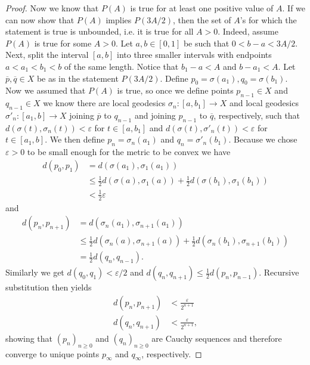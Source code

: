 \documentclass[11pt, a4paper, oneside]{memoir}
\theoremstyle{plain}\newtheorem{theorem}[subsection]{Theorem}
\theoremstyle{definition}
\begin{document}
\begin{proof}
\medskip
Now we know that $P(A)$ is true for at least one positive value of \(A\). If we can now show that \(P(A)\) implies \(P(3A/2)\), then the set of \(A\)'s for which the statement is true is unbounded, i.e. it is true for all \(A>0\). Indeed, assume $P(A)$ is true for some \(A>0\).
Let \(a,b\in [0,1]\) be such that \(0<b-a<3A/2\).
Next, split the interval \([a,b]\) into three smaller intervals with endpoints \(a<a_1<b_1<b\) of the same length.
Notice that \(b_1-a<A\) and \(b-a_1<A\).
Let \(\overline{p},\overline{q}\in X\) be as in the statement \(P(3A/2)\).
Define \(p_0=\sigma(a_1),q_0=\sigma(b_1)\).
Now we assumed that \(P(A)\) is true, so once we define points \(p_{n-1}\in X\) and \(q_{n-1}\in X\) we know there are local geodesics \(\sigma_n:[a,b_1]\to X\) and local geodesics \(\sigma'_n:[a_1,b]\to X\) joining \(\overline{p}\) to \(q_{n-1}\) and joining \(p_{n-1}\) to \(\overline{q}\), respectively, such that \(d(\sigma(t),\sigma_n(t))<\varepsilon\) for \(t\in [a,b_1]\) and \(d(\sigma(t),\sigma'_n(t))<\varepsilon\) for \(t\in [a_1,b]\).
We then define \(p_n=\sigma_n(a_1)\) and \(q_n=\sigma'_n(b_1)\).
Because we chose \(\varepsilon>0\) to be small enough for the metric to be convex we have 
\begin{align*}
d(p_0,p_1)&=d(\sigma(a_1),\sigma_1(a_1))\\
&\leq \frac{1}{2}d(\sigma(a),\sigma_1(a))+\frac{1}{2}d(\sigma(b_1),\sigma_1(b_1))\\
&<\frac{1}{2}\varepsilon
\end{align*}
and
\begin{align*}
d(p_n,p_{n+1})&=d(\sigma_n(a_1),\sigma_{n+1}(a_1))\\
&\leq\frac{1}{2}d(\sigma_n(a),\sigma_{n+1}(a))+\frac{1}{2}d(\sigma_n(b_1),\sigma_{n+1}(b_1))\\
&=\frac{1}{2}d(q_n,q_{n-1}).
\end{align*}
Similarly we get \(d(q_0,q_1)<\varepsilon/2\) and \(d(q_n,q_{n+1})\leq \frac{1}{2}d(p_n,p_{n-1})\).
Recursive substitution then yields
\begin{align*}
d(p_n,p_{n+1})&<\frac{\varepsilon}{2^{n+1}}\\
d(q_n,q_{n+1})&<\frac{\varepsilon}{2^{n+1}},
\end{align*}
showing that \((p_n)_{n\geq 0}\) and \((q_n)_{n\geq 0}\) are Cauchy sequences and therefore converge to unique points \(p_\infty\) and \(q_\infty\), respectively.


\end{proof}
\end{document}
